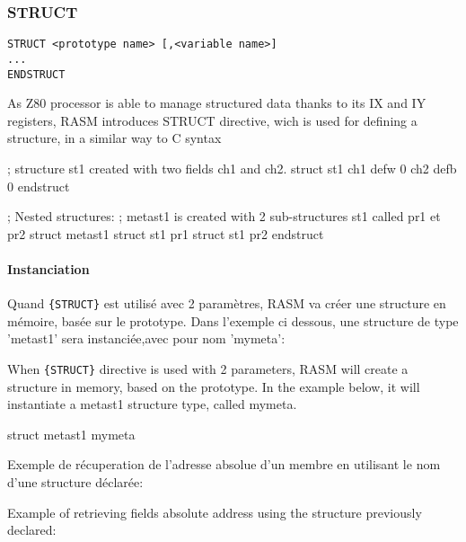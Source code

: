 
\subsubsection{STRUCT}  
\begin{verbatim}
STRUCT <prototype name> [,<variable name>]
...
ENDSTRUCT
\end{verbatim}

\begin{xen}
As Z80 processor is able to manage structured data thanks to its IX and IY registers, RASM introduces STRUCT directive, wich is used for defining a structure, in a similar way to C syntax
\end{xen}

\begin{code}
; structure st1 created with two fields ch1 and ch2.
struct st1
 ch1 defw 0
 ch2 defb 0
endstruct

; Nested structures:
; metast1 is created with 2 sub-structures st1 called pr1 et pr2
struct metast1
 struct st1 pr1
 struct st1 pr2
endstruct
\end{code}



\begin{xfr}
\paragraph{Instanciation}

Quand \texttt{\{STRUCT\}} est utilisé avec 2 paramètres, RASM va créer une structure en mémoire, basée sur le prototype.
Dans l'exemple ci dessous, une structure de type 'metast1' sera instanciée,avec pour nom 'mymeta':
\end{xfr}

\begin{xen}
When \texttt{\{STRUCT\}} directive is used with 2 parameters, RASM will create a structure in memory, based on the prototype.
In the example below, it will instantiate a metast1 structure type, called mymeta.
\end{xen}

\begin{code}
struct metast1 mymeta
\end{code}

\begin{xfr}
Exemple de récuperation de l'adresse absolue d'un membre en utilisant le nom d'une structure déclarée:
\end{xfr}

\begin{xen}
Example of retrieving fields absolute address using the structure previously declared:
\end{xen}

